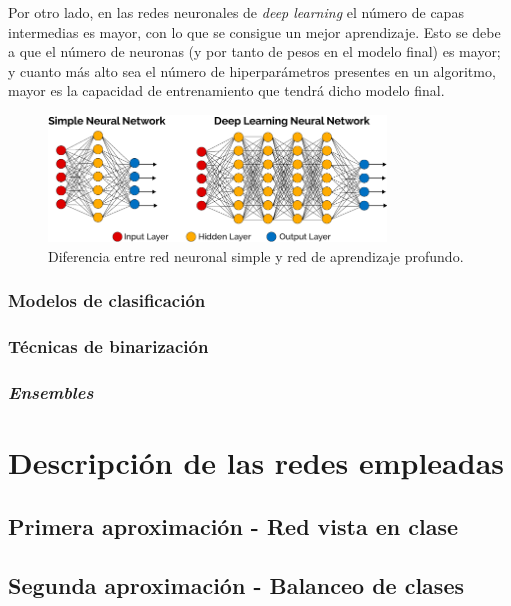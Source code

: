 \documentclass[]{scrartcl}
\begin{document}
		Por otro lado, en las redes neuronales de \textit{deep learning} el número de capas intermedias es mayor, con lo que se consigue un mejor aprendizaje. Esto se debe a que el número de neuronas (y por tanto de pesos en el modelo final) es mayor; y cuanto más alto sea el número de hiperparámetros presentes en un algoritmo, mayor es la capacidad de entrenamiento que tendrá dicho modelo final.
		
		\begin{figure}[h]
			\centering
			\includegraphics[width=0.8\textwidth]{./img/neural-network-differences}
			\caption{Diferencia entre red neuronal simple y red de aprendizaje profundo.}
			\label{nn-differences}
		\end{figure}
	
		\subsubsection{Modelos de clasificación}
		
		\subsubsection{Técnicas de binarización}
		
		\subsubsection{\textit{Ensembles}}

\section{Descripción de las redes empleadas}

	\subsection{Primera aproximación - Red vista en clase}
	
	\subsection{Segunda aproximación - Balanceo de clases}
	
\end{document}
